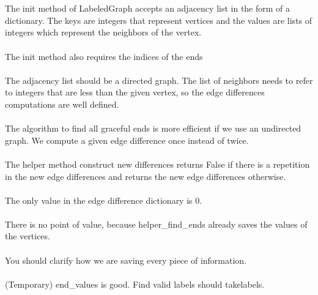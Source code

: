 \documentclass{article}
\begin{document}
\section{}
\paragraph{} The init method of LabeledGraph accepts an adjacency list in the form of a dictionary. The keys are integers that represent vertices and the values are lists of integers which represent the neighbors of the vertex.
\paragraph{} The init method also requires the indices of the ends
\paragraph{} The adjacency list should be a directed graph. The list of neighbors needs to refer to integers that are less than the given vertex, so the edge differences computations are well defined.
\paragraph{} The algorithm to find all graceful ends is more efficient if we use an undirected graph. We compute a given edge difference once instead of twice.
\paragraph{} The helper method construct new differences returns False if there is a repetition in the new edge differences and returns the new edge differences otherwise.
\paragraph{} The only value in the edge difference dictionary is 0.
\paragraph{} There is no point of value, because helper\_find\_ends already saves the values of the vertices.
\paragraph{} You should clarify how we are saving every piece of information.
\paragraph{} (Temporary) end\_values is good. Find valid labels should
takelabels.
\end{document}
